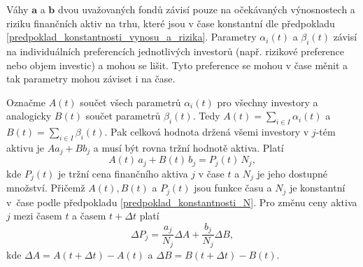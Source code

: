 \documentclass[a4paper,12pt]{report}
\theoremstyle{definition} \newtheorem{definice}[veta]{Definice}
\theoremstyle{remark}
\begin{document}
Váhy $\boldsymbol{a}$ a  $\boldsymbol{b}$ dvou uvažovaných fondů závisí pouze na očekávaných výnosnostech a riziku finančních aktiv na trhu, které jsou v čase konstantní dle předpokladu \ref{predpoklad_konstantnosti_vynosu_a_rizika}.
Parametry $\alpha_i(t)$ a $\beta_i(t)$ závisí na individuálních preferencích jednotlivých investorů (např. rizikové preference nebo objem investic) a mohou se lišit.
Tyto preference se mohou v čase měnit a tak parametry mohou záviset i na čase.

Označme $A(t)$ součet všech parametrů $\alpha_i(t)$ pro všechny investory a analogicky $B(t)$ součet parametrů $\beta_i(t)$.
Tedy $A(t)=\sum_{i\in I}\alpha_i(t)$ a $B(t)=\sum_{i\in I}\beta_i(t)$.
Pak celková hodnota držená všemi investory v $j$-tém aktivu je $Aa_j+Bb_j$ a musí být rovna tržní hodnotě aktiva.
Platí
$$A(t)\,a_j+B(t)\,b_j=P_j(t)\,N_j,$$
kde $P_j(t)$ je tržní cena finančního aktiva $j$ v čase $t$ a $N_j$ je jeho dostupné množství.
Přičemž $A(t),B(t)$ a $ P_j(t)$ jsou funkce času a $N_j$ je konstantní v~čase podle předpokladu \ref{predpoklad_konstantnosti_N}.
Pro změnu ceny aktiva $j$ mezi časem $t$ a časem $t+\Delta t$ platí
\begin{displaymath}
\Delta P_j = \frac{a_j}{N_j}\Delta A + \frac{b_j}{N_j}\Delta B,
\end{displaymath}
kde $\Delta A = A(t+\Delta t) - A(t)$ a $\Delta B = B(t+\Delta t)- B(t)$.
\end{document}
